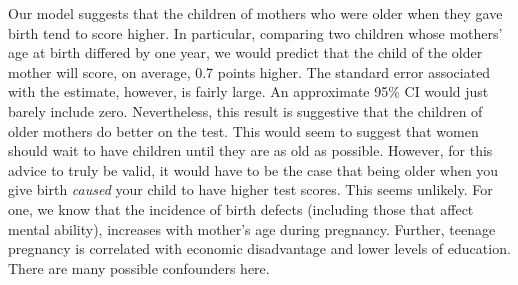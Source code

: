 \documentclass[addpoints,12pt]{exam}\usepackage[]{graphicx}\usepackage[]{color}
\newenvironment{knitrout}{}{} %
\begin{document}
\begin{questions}
\begin{parts}
\begin{solution}
\begin{knitrout}
\end{knitrout}
Our model suggests that the children of mothers who were older when they gave birth tend to score higher. In particular, comparing two children whose mothers' age at birth differed by one year, we would predict that the child of the older mother will score, on average, 0.7 points higher. The standard error associated with the estimate, however, is fairly large. An approximate 95\% CI would just barely include zero. Nevertheless, this result is suggestive that the children of older mothers do better on the test. This would seem to suggest that women should wait to have children until they are as old as possible. However, for this advice to truly be valid, it would have to be the case that being older when you give birth \emph{caused} your child to have higher test scores. This seems unlikely. For one, we know that the incidence of birth defects (including those that affect mental ability), increases with mother's age during pregnancy. Further, teenage pregnancy is correlated with economic disadvantage and lower levels of education. There are many possible confounders here.
    \end{solution}

\end{parts}
\end{questions}
\end{document}
